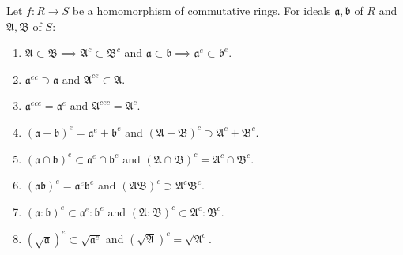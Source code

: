 Let $f : R \to S$ be a homomorphism of commutative rings. For ideals $\mathfrak{a}, \mathfrak{b}$ of $R$ and $\mathfrak{A}, \mathfrak{B}$ of $S$:

\begin{enumerate}
\item[(1)] $\mathfrak{A} \subset \mathfrak{B} \implies \mathfrak{A}^c \subset \mathfrak{B}^c$ and $\mathfrak{a} \subset \mathfrak{b} \implies \mathfrak{a}^e \subset \mathfrak{b}^e$.
\item[(2)] $\mathfrak{a}^{ec} \supset \mathfrak{a}$ and $\mathfrak{A}^{ce} \subset \mathfrak{A}$.
\item[(3)] $\mathfrak{a}^{ece} = \mathfrak{a}^e$ and $\mathfrak{A}^{cec} = \mathfrak{A}^c$.
\item[(4)] $(\mathfrak{a} + \mathfrak{b})^e = \mathfrak{a}^e + \mathfrak{b}^e$ and $(\mathfrak{A} + \mathfrak{B})^c \supset \mathfrak{A}^c + \mathfrak{B}^c$.
\item[(5)] $(\mathfrak{a} \cap \mathfrak{b})^e \subset \mathfrak{a}^e \cap \mathfrak{b}^e$ and $(\mathfrak{A} \cap \mathfrak{B})^c = \mathfrak{A}^c \cap \mathfrak{B}^c$.
\item[(6)] $(\mathfrak{a}\mathfrak{b})^e = \mathfrak{a}^e \mathfrak{b}^e$ and $(\mathfrak{A}\mathfrak{B})^c \supset \mathfrak{A}^c \mathfrak{B}^c$.
\item[(7)] $(\mathfrak{a} : \mathfrak{b})^e \subset \mathfrak{a}^e : \mathfrak{b}^e$ and $(\mathfrak{A} : \mathfrak{B})^c \subset \mathfrak{A}^c : \mathfrak{B}^c$.
\item[(8)] $(\sqrt{\mathfrak{a}})^e \subset \sqrt{\mathfrak{a}^e}$ and $(\sqrt{\mathfrak{A}})^c = \sqrt{\mathfrak{A}^c}$.
\end{enumerate}
